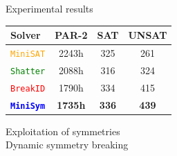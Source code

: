 \documentclass{beamer}
\begin{document}
\begin{frame}{Experimental results}
\begin{table}
\begin{tabular}{lccc}
	Solver & PAR-2  & SAT & UNSAT\\
	\toprule
	\textcolor{orange}{\texttt{MiniSAT}} & 2243h  &325 &261 \\
	\textcolor{green}{\texttt{Shatter}} &2088h  & 316 &324 \\
	\textcolor{red}{\texttt{BreakID}} &1790h  &334 &415 \\
	\textcolor{blue}{\textbf{\texttt{MiniSym}}} &  \cellcolor{gray!30}\textbf{1735h} & \cellcolor{gray!30}\textbf{336} &  \cellcolor{gray!30}\textbf{439} \\

\end{tabular}


\end{table}

\end{frame}


\begin{frame}
\centering
\textcolor{UPMCEngagementBlueB}{\Large Exploitation of symmetries}\\
\vspace{2em}
\textcolor{UPMCEngagementBlueB}{\Large Dynamic symmetry breaking}
\end{frame}
\end{document}
